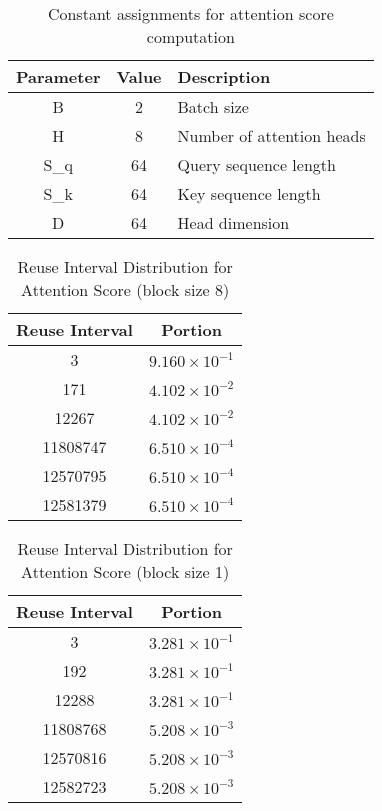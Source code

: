 \documentclass[conference]{article}
\begin{document}
\begin{table}[H]
\centering
  \begin{tabular}{|c|c|l|}
  \hline
  Parameter & Value & Description \\
  \hline
    B & 2 & Batch size \\
    H & 8 & Number of attention heads \\
    S\_q & 64 & Query sequence length \\
    S\_k & 64 & Key sequence length \\
    D & 64 & Head dimension \\
  \hline
  \end{tabular}
  \caption{Constant assignments for attention score computation}
\end{table}

\begin{table}[H]
\centering
\begin{tabular}{|c|c|}
    \hline
    Reuse Interval & Portion \\ 
    \hline
    3 & $9.160 \times 10^{-1}$ \\ 
    171 & $4.102 \times 10^{-2}$ \\ 
    12267 & $4.102 \times 10^{-2}$ \\ 
    11808747 & $6.510 \times 10^{-4}$ \\ 
    12570795 & $6.510 \times 10^{-4}$ \\ 
    12581379 & $6.510 \times 10^{-4}$ \\ 
    \hline
\end{tabular}
\caption{Reuse Interval Distribution for Attention Score (block size 8)}
\end{table}

\begin{table}[H]
\centering
\begin{tabular}{|c|c|}
    \hline
    Reuse Interval & Portion \\ 
    \hline
    3 & $3.281 \times 10^{-1}$ \\ 
    192 & $3.281 \times 10^{-1}$ \\ 
    12288 & $3.281 \times 10^{-1}$ \\ 
    11808768 & $5.208 \times 10^{-3}$ \\ 
    12570816 & $5.208 \times 10^{-3}$ \\ 
    12582723 & $5.208 \times 10^{-3}$ \\ 
    \hline
\end{tabular}
\caption{Reuse Interval Distribution for Attention Score (block size 1)}
\end{table}
\end{document}
